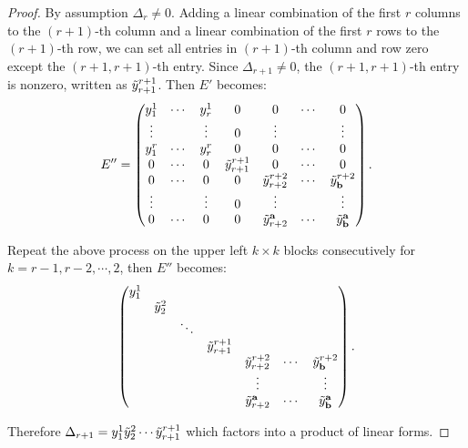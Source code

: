 \documentclass[10pt]{article} %
\newcommand{\aaa}{\mathbf{a}}
\newcommand{\bbb}{\mathbf{b}}
\theoremstyle{definition}
\begin{document}
\begin{proof}
By assumption $\Delta_{r}\neq 0$. Adding a linear combination of the first $r$ columns to the $(r+1)$-th column and a linear combination of the first $r$ rows to the $(r+1)$-th row, we can set all entries in $(r+1)$-th column and row zero except the $(r+1,r+1)$-th entry. Since $\Delta_{r+1}\neq 0$, the $(r+1,r+1)$-th entry is nonzero, written as $\Tilde{y}^{r+1}_{r+1}$. Then $E'$ becomes:
$$E''=\begin{pmatrix}
y^1_1 & \cdots & y^1_{r}&0 & 0 & \cdots & 0\\
\vdots &       &\vdots&0 & \vdots &  &\vdots\\
y^{r}_1 & \cdots & y^{r}_{r} &0 &0 & \cdots & 0\\
0 & \cdots & 0 & \Tilde{y}^{r+1}_{r+1}& 0 & \cdots & 0\\
0 & \cdots & 0 & 0 & \Tilde{y}^{r+2}_{r+2} & \cdots & \Tilde{y}^{r+2}_{\bbb}\\
\vdots &  & \vdots & 0 & \vdots &   & \vdots\\
0 & \cdots & 0 & 0 & \Tilde{y}^{\aaa}_{r+2} & \cdots & \Tilde{y}^{\aaa}_{\bbb}
\end{pmatrix}.$$

Repeat the above process on the upper left $k\times k$ blocks consecutively for $k=r-1,r-2,\cdots,2$, then $E''$ becomes:
$$\begin{pmatrix}
y^1_1 &  &  &  &  &  &\\
 &  \Tilde{y}^2_2 &  &  &  &  &\\
 & & \ddots &  &  &  &\\
 & & &\Tilde{y}^{r+1}_{r+1}&  &  &\\
 & & & & \Tilde{y}^{r+2}_{r+2} & \cdots & \Tilde{y}^{r+2}_{\bbb}\\
 & & & & \vdots &   & \vdots\\
 & & & & \Tilde{y}^{\aaa}_{r+2} & \cdots & \Tilde{y}^{\aaa}_{\bbb}\\
\end{pmatrix}.$$

Therefore $\Delta_{r+1}=y^1_1\Tilde{y}^2_2\cdots\Tilde{y}^{r+1}_{r+1}$ which factors into a product of linear forms.
\end{proof}
\end{document}
